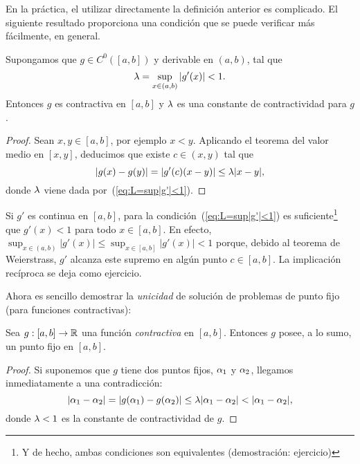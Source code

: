 En la práctica, el utilizar directamente la definición anterior
es complicado. El siguiente resultado proporciona una condición que
se puede verificar más fácilmente, en general.
\begin{proposition}
  \label{pro:1}
  Supongamos que $g\in C^0([a,b])$ y derivable en $(a,b)$, tal que
  \begin{equation}
    \lambda=\sup_{x\in(a,b)} |g'(x)|<1.
    \label{eq:L=sup|g'|<1}
  \end{equation}
  Entonces $g$ es contractiva en $[a,b]$ y $\lambda$ es una
  constante de contractividad para $g$.
\end{proposition}
\begin{proof}
  Sean $x,y\in [a,b]$, por ejemplo $x<y$. Aplicando el teorema del
  valor medio en $[x,y]$, deducimos que existe $c\in (x,y)$ tal que
  \begin{equation*}
    |g(x)-g(y)|=|g'(c)(x-y)| \le \lambda |x-y|,
  \end{equation*}
  donde $\lambda$ viene dada por~(\ref{eq:L=sup|g'|<1}).
\end{proof}

\begin{remark}
  Si $g'$ es continua en $[a,b]$, para la
  condición~(\ref{eq:L=sup|g'|<1}) es suficiente\footnote{Y de hecho,
    ambas condiciones son equivalentes (demostración: ejercicio)} que
  $g'(x)<1$ para todo $x\in[a,b]$.  En efecto,
  $\sup_{x\in(a,b)}|g'(x)| \le \sup_{x\in[a,b]} |g'(x)|<1$ porque,
  debido al teorema de Weierstrass, $g'$ alcanza este supremo en algún
  punto $c\in [a,b]$. La implicación recíproca se deja como ejercicio.
  \label{rk:3}
\end{remark}

Ahora es sencillo demostrar la \textit{unicidad} de solución de
problemas de punto fijo (para funciones contractivas):
\begin{proposition}
  \label{pro:unicidad-punto-fijo}
  Sea $g:[a,b]\to\operatorname{{\mathbb R}}$ una función \emph{contractiva} en
  $[a,b]$. Entonces $g$ posee, a lo sumo, un punto fijo en $[a,b]$.
\end{proposition}

\begin{proof}
  Si suponemos que $g$ tiene dos puntos fijos, $\alpha_1$ y
  $\alpha_2$, llegamos inmediatamente a una contradicción:
  $$
  |\alpha_1-\alpha_2| = |g(\alpha_1)-g(\alpha_2)| \le \lambda |\alpha_1 -
  \alpha_2| < |\alpha_1-\alpha_2|,$$
  donde $\lambda<1$ es la constante de contractividad de $g$.
\end{proof}

